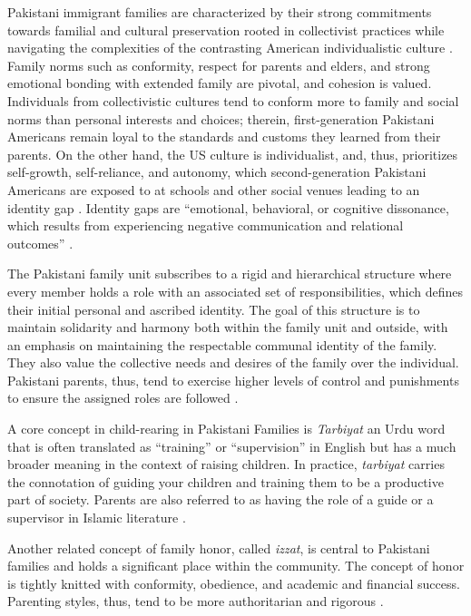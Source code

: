 Pakistani immigrant families are characterized by their strong commitments towards familial and cultural preservation rooted in collectivist practices while navigating the complexities of the contrasting American individualistic culture \citep{PakistaniImmigrantsSocial, chaudharyTaleTwoGenerations2024}. Family norms such as conformity, respect for parents and elders, and strong emotional bonding with extended family are pivotal, and cohesion is valued. Individuals from collectivistic cultures tend to conform more to family and social norms than personal interests and choices; therein, first-generation Pakistani Americans remain loyal to the standards and customs they learned from their parents. On the other hand, the US culture is individualist, and, thus, prioritizes self-growth, self-reliance, and autonomy, which second-generation Pakistani Americans are exposed to at schools and other social venues leading to an identity gap \citep{saleemFamilyCommunicationProsocial2021}. Identity gaps are ``emotional, behavioral, or cognitive dissonance, which results from experiencing negative communication and relational outcomes'' \citep[p.~225]{hechtCommunicationTheoryIdentity2021}.

The Pakistani family unit subscribes to a rigid and hierarchical structure where every member holds a role with an associated set of responsibilities, which defines their initial personal and ascribed identity. The goal of this structure is to maintain solidarity and harmony both within the family unit and outside, with an emphasis on maintaining the respectable communal identity of the family. They also value the collective needs and desires of the family over the individual. Pakistani parents, thus, tend to exercise higher levels of control and punishments to ensure the assigned roles are followed \citep{anjumRELATIONSHIPPARENTINGSTYLES2019, chanEarlyLookParental2020}.

A core concept in child-rearing in Pakistani Families is \emph{Tarbiyat} an Urdu word that is often translated as ``training'' or ``supervision'' in English but has a much broader meaning in the context of raising children. In practice, \emph{tarbiyat} carries the connotation of guiding your children and training them to be a productive part of society. Parents are also referred to as having the role of a guide or a supervisor in Islamic literature \citep{chanEarlyLookParental2020}. 

Another related concept of family honor, called \emph{izzat}, is central to Pakistani families and holds a significant place within the community. The concept of honor is tightly knitted with conformity, obedience, and academic and financial success. Parenting styles, thus, tend to be more authoritarian and rigorous \citep{kaliaBufferingParentchildConflict2022, raufRelationshipAuthoritarianParenting2017}.

